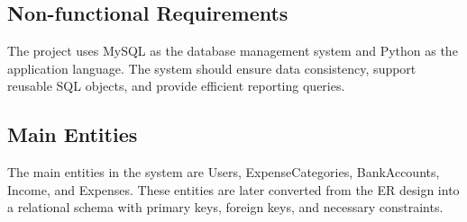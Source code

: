 \subsection{Non-functional Requirements}
The project uses MySQL as the database management system and Python as the application language. The system should ensure data consistency, support reusable SQL objects, and provide efficient reporting queries.

\subsection{Main Entities}
The main entities in the system are Users, ExpenseCategories, BankAccounts, Income, and Expenses. These entities are later converted from the ER design into a relational schema with primary keys, foreign keys, and necessary constraints.
